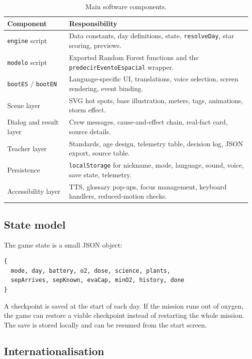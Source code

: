 \documentclass[11pt,a4paper]{article}
\newcommand{\code}[1]{\texttt{#1}}
\begin{document}
\begin{table}[H]
\centering
\small
\begin{tabular}{@{}p{4.0cm}p{10.4cm}@{}}
\toprule
\textbf{Component} & \textbf{Responsibility}\\
\midrule
\code{engine} script & Data constants, day definitions, state, \code{resolveDay}, star scoring, previews.\\
\code{modelo} script & Exported Random Forest functions and the \code{predecirEventoEspacial} wrapper.\\
\code{bootES} / \code{bootEN} & Language-specific UI, translations, voice selection, screen rendering, event binding.\\
Scene layer & SVG hot spots, base illustration, meters, tags, animations, storm effect.\\
Dialog and result layer & Crew messages, cause-and-effect chain, real-fact card, source details.\\
Teacher layer & Standards, age design, telemetry table, decision log, JSON export, source table.\\
Persistence & \code{localStorage} for nickname, mode, language, sound, voice, save state, telemetry.\\
Accessibility layer & TTS, glossary pop-ups, focus management, keyboard handlers, reduced-motion checks.\\
\bottomrule
\end{tabular}
\caption{Main software components.}
\label{tab:components}
\end{table}

\subsection{State model}

The game state is a small JSON object:

\begin{verbatim}
{
  mode, day, battery, o2, dose, science, plants,
  sepArrives, sepKnown, evaCap, minO2, history, done
}
\end{verbatim}

A checkpoint is saved at the start of each day. If the mission runs out of oxygen, the game can restore a viable checkpoint instead of restarting the whole mission. The save is stored locally and can be resumed from the start screen.

\subsection{Internationalisation}
\end{document}
